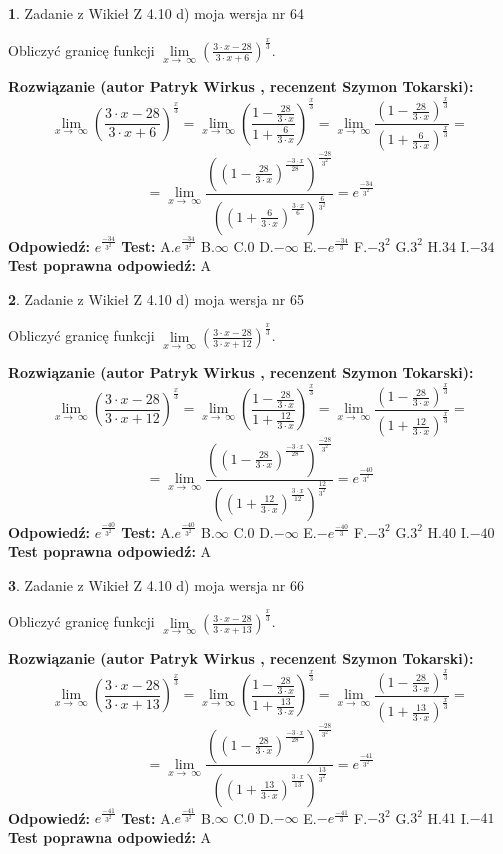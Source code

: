 \documentclass[12pt, a4paper]{article}
\theoremstyle{definition} %
\newtheorem{zad}{}
\newcommand{\zadStart}[1]{\begin{zad}#1\newline}
\newcommand{\zadStop}{\end{zad}}
\newcommand{\rozwStart}[2]{\noindent \textbf{Rozwiązanie (autor #1 , recenzent #2): }\newline}
\newcommand{\rozwStop}{\newline}
\newcommand{\odpStart}{\noindent \textbf{Odpowiedź:}\newline}
\newcommand{\odpStop}{\newline}
\newcommand{\testStart}{\noindent \textbf{Test:}\newline}
\newcommand{\testStop}{\newline}
\newcommand{\kluczStart}{\noindent \textbf{Test poprawna odpowiedź:}\newline}
\newcommand{\kluczStop}{\newline}
\begin{document}
\zadStart{Zadanie z Wikieł Z 4.10 d) moja wersja nr 64}


Obliczyć granicę funkcji  $\lim\limits_{x\to\ \infty}(\frac{3\cdot x-28}{3\cdot x+6})^{\frac{x}{3}}$.
\zadStop
\rozwStart{Patryk Wirkus}{Szymon Tokarski}
$$\lim\limits_{x\to\ \infty}(\frac{3\cdot x-28}{3\cdot x+6})^{\frac{x}{3}} = \lim\limits_{x\to\ \infty}(\frac{1-\frac{28}{3\cdot x}}{1+\frac{6}{3\cdot x}})^{\frac{x}{3}}=\lim\limits_{x\to\ \infty}\frac{(1-\frac{28}{3\cdot x})^{\frac{x}{3}}}{(1+\frac{6}{3\cdot x})^{\frac{x}{3}}}=$$
$$=\lim\limits_{x\to\ \infty}\frac{((1-\frac{28}{3\cdot x})^{\frac{-3\cdot x}{28}})^{\frac{-28}{3^{2}}}}{((1+\frac{6}{3\cdot x})^{\frac{3\cdot x}{6}})^{\frac{6}{3^{2}}}}=e^{\frac{-34}{3^{2}}}$$
\rozwStop
\odpStart
$e^{\frac{-34}{3^{2}}}$
\odpStop
\testStart
A.$e^{\frac{-34}{3^{2}}}$ B.$\infty$ C.$0$ D.$-\infty$ E.$-e^{\frac{-34}{3}}$
F.$-3^{2}$ G.$3^{2}$
H.$34$
I.$-34$
\testStop
\kluczStart
A
\kluczStop



\zadStart{Zadanie z Wikieł Z 4.10 d) moja wersja nr 65}


Obliczyć granicę funkcji  $\lim\limits_{x\to\ \infty}(\frac{3\cdot x-28}{3\cdot x+12})^{\frac{x}{3}}$.
\zadStop
\rozwStart{Patryk Wirkus}{Szymon Tokarski}
$$\lim\limits_{x\to\ \infty}(\frac{3\cdot x-28}{3\cdot x+12})^{\frac{x}{3}} = \lim\limits_{x\to\ \infty}(\frac{1-\frac{28}{3\cdot x}}{1+\frac{12}{3\cdot x}})^{\frac{x}{3}}=\lim\limits_{x\to\ \infty}\frac{(1-\frac{28}{3\cdot x})^{\frac{x}{3}}}{(1+\frac{12}{3\cdot x})^{\frac{x}{3}}}=$$
$$=\lim\limits_{x\to\ \infty}\frac{((1-\frac{28}{3\cdot x})^{\frac{-3\cdot x}{28}})^{\frac{-28}{3^{2}}}}{((1+\frac{12}{3\cdot x})^{\frac{3\cdot x}{12}})^{\frac{12}{3^{2}}}}=e^{\frac{-40}{3^{2}}}$$
\rozwStop
\odpStart
$e^{\frac{-40}{3^{2}}}$
\odpStop
\testStart
A.$e^{\frac{-40}{3^{2}}}$ B.$\infty$ C.$0$ D.$-\infty$ E.$-e^{\frac{-40}{3}}$
F.$-3^{2}$ G.$3^{2}$
H.$40$
I.$-40$
\testStop
\kluczStart
A
\kluczStop



\zadStart{Zadanie z Wikieł Z 4.10 d) moja wersja nr 66}


Obliczyć granicę funkcji  $\lim\limits_{x\to\ \infty}(\frac{3\cdot x-28}{3\cdot x+13})^{\frac{x}{3}}$.
\zadStop
\rozwStart{Patryk Wirkus}{Szymon Tokarski}
$$\lim\limits_{x\to\ \infty}(\frac{3\cdot x-28}{3\cdot x+13})^{\frac{x}{3}} = \lim\limits_{x\to\ \infty}(\frac{1-\frac{28}{3\cdot x}}{1+\frac{13}{3\cdot x}})^{\frac{x}{3}}=\lim\limits_{x\to\ \infty}\frac{(1-\frac{28}{3\cdot x})^{\frac{x}{3}}}{(1+\frac{13}{3\cdot x})^{\frac{x}{3}}}=$$
$$=\lim\limits_{x\to\ \infty}\frac{((1-\frac{28}{3\cdot x})^{\frac{-3\cdot x}{28}})^{\frac{-28}{3^{2}}}}{((1+\frac{13}{3\cdot x})^{\frac{3\cdot x}{13}})^{\frac{13}{3^{2}}}}=e^{\frac{-41}{3^{2}}}$$
\rozwStop
\odpStart
$e^{\frac{-41}{3^{2}}}$
\odpStop
\testStart
A.$e^{\frac{-41}{3^{2}}}$ B.$\infty$ C.$0$ D.$-\infty$ E.$-e^{\frac{-41}{3}}$
F.$-3^{2}$ G.$3^{2}$
H.$41$
I.$-41$
\testStop
\kluczStart
A
\kluczStop
\end{document}
